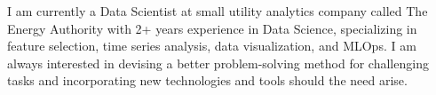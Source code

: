 

\begin{cvparagraph}

I am currently a Data Scientist at small utility analytics company called The Energy Authority with 2+ years experience in Data Science, specializing in feature selection, time series analysis, data visualization, and MLOps. I am always interested in devising a better problem-solving method for challenging tasks and incorporating new technologies and tools should the need arise.
\end{cvparagraph}
